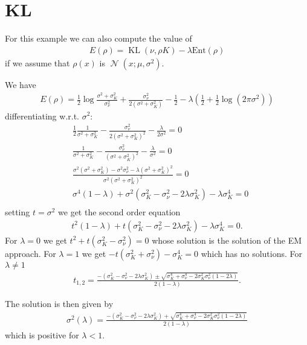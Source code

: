 \documentclass[a4paper]{amsart}
\DeclareMathOperator{\N}{\mathcal{N}}
\DeclareMathOperator{\KL}{KL}
\begin{document}
\section{KL}
For this example we can also compute the value of
\begin{align*}
E(\rho) = \KL(\nu, \rho K) - \lambda \text{Ent}(\rho)
\end{align*}
if we assume that $\rho(x)$ is $\N(x; \mu, \sigma^2)$.

We have
\begin{align*}
E(\rho) = \frac{1}{2}\log \frac{\sigma^2 + \sigma^2_K}{\sigma^2_{\nu}} + \frac{\sigma^2_{\nu}}{2(\sigma^2 + \sigma^2_K)} - \frac{1}{2} - \lambda \left(\frac{1}{2} + \frac{1}{2}\log(2\pi \sigma^2)\right)
\end{align*}
differentiating w.r.t. $\sigma^2$:
\begin{align*}
&\frac{1}{2} \frac{1}{\sigma^2 + \sigma^2_K} - \frac{\sigma^2_{\nu}}{2(\sigma^2 + \sigma^2_K)^2} - \frac{\lambda }{2\sigma^2} = 0\\
&\frac{1}{\sigma^2 + \sigma^2_K} - \frac{\sigma^2_{\nu}}{(\sigma^2 + \sigma^2_K)^2} - \frac{\lambda }{\sigma^2} = 0\\
& \frac{\sigma^2(\sigma^2 + \sigma^2_K) - \sigma^2\sigma_{\nu}^2 - \lambda(\sigma^2 + \sigma^2_K)^2}{\sigma^2(\sigma^2 + \sigma^2_K)^2} = 0\\
& \sigma^4(1 - \lambda) + \sigma^2(\sigma_K^2 - \sigma_{\nu}^2 - 2\lambda\sigma_K^2) - \lambda\sigma_K^4 = 0\\
\end{align*}
setting $t= \sigma^2$ we get the second order equation
\begin{align*}
t^2(1 - \lambda) + t(\sigma_K^2 - \sigma_{\nu}^2 - 2\lambda\sigma_K^2) - \lambda\sigma_K^4 = 0.
\end{align*}
For $\lambda = 0$ we get $t^2 + t(\sigma_K^2 - \sigma_{\nu}^2)= 0$ whose solution is the solution of the EM approach. For $\lambda = 1$ we get $ -t(\sigma_K^2 + \sigma_{\nu}^2) - \sigma_K^4 = 0$ which has no solutions. For $\lambda \neq 1$
\begin{align*}
t_{1, 2} = \frac{-(\sigma_K^2 - \sigma_{\nu}^2 - 2\lambda\sigma_K^2) \pm \sqrt{\sigma_K^4 + \sigma_{\nu}^4 - 2\sigma_K^2\sigma_{\nu}^2(1 - 2\lambda)}}{2(1 - \lambda)}.
\end{align*}

The solution is then given by
\begin{align*}
\sigma^2(\lambda) = \frac{-(\sigma_K^2 - \sigma_{\nu}^2 - 2\lambda\sigma_K^2) + \sqrt{\sigma_K^4 + \sigma_{\nu}^4 - 2\sigma_K^2\sigma_{\nu}^2(1 - 2\lambda)}}{2(1 - \lambda)}
\end{align*}
which is positive for $\lambda<1$.
\end{document}
